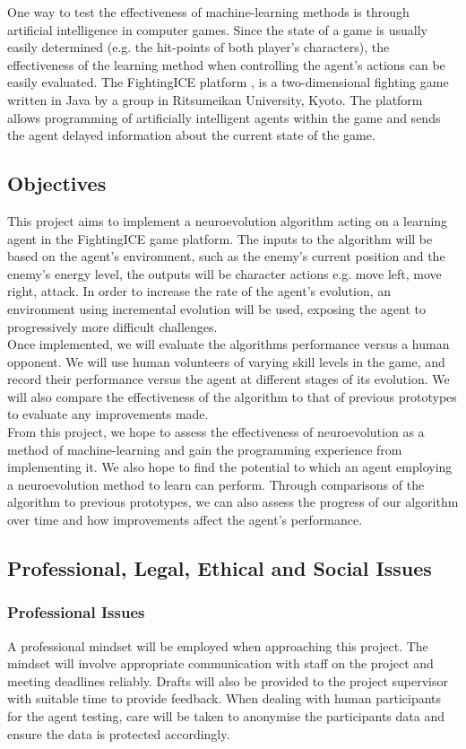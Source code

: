 \documentclass[12pt,a4paper]{article}
\begin{document}
One way to test the effectiveness of machine-learning methods is through artificial intelligence in computer games. Since the state of a game is usually easily determined (e.g. the hit-points of both player's characters), the effectiveness of the learning method when controlling the agent's actions can be easily evaluated. The FightingICE platform \cite{fightingice}, is a two-dimensional fighting game written in Java by a group in Ritsumeikan University, Kyoto. The platform allows programming of artificially intelligent agents within the game and sends the agent delayed information about the current state of the game. 
\newpage
\subsection{Objectives}
This project aims to implement a neuroevolution algorithm acting on a learning agent in the FightingICE game platform. The inputs to the algorithm will be based on the agent's environment, such as the enemy's current position and the enemy's energy level, the outputs will be character actions e.g. move left, move right, attack. In order to increase the rate of the agent's evolution, an environment using incremental evolution will be used, exposing the agent to progressively more difficult challenges.\\

Once implemented, we will evaluate the algorithms performance versus a human opponent. We will use human volunteers of varying skill levels in the game, and record their performance versus the agent at different stages of its evolution. We will also compare the effectiveness of the algorithm to that of previous prototypes to evaluate any improvements made.\\

From this project, we hope to assess the effectiveness of neuroevolution as a method of machine-learning and gain the programming experience from implementing it. We also hope to find the potential to which an agent employing a neuroevolution method to learn can perform. Through comparisons of the algorithm to previous prototypes, we can also assess the progress of our algorithm over time and how improvements affect the agent's performance.
\newpage
\subsection{Professional, Legal, Ethical and Social Issues}
\subsubsection{Professional Issues}
A professional mindset will be employed when approaching this project. The mindset will involve appropriate communication with staff on the project and meeting deadlines reliably. Drafts will also be provided to the project supervisor with suitable time to provide feedback. When dealing with human participants for the agent testing, care will be taken to anonymise the participants data and ensure the data is protected accordingly.
\end{document}
